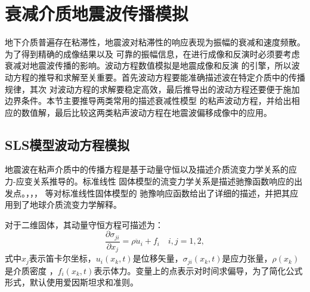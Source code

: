 \vspace{0.5cm}
\section{衰减介质地震波传播模拟}
\vspace{0.5cm}
地下介质普遍存在粘滞性，地震波对粘滞性的响应表现为振幅的衰减和速度频散。为了得到精确的成像结果以及
可靠的振幅信息，在进行成像和反演时必须要考虑衰减对地震波传播的影响。波动方程数值模拟是地震成像和反演
的引擎，所以波动方程的推导和求解至关重要。首先波动方程要能准确描述波在特定介质中的传播规律，其次
对波动方程的求解要稳定高效，最后推导出的波动方程还要便于施加边界条件。本节主要推导两类常用的描述衰减性模型
的粘声波动方程，并给出相应的数值解，最后比较这两类粘声波动方程在地震波偏移成像中的应用。

\subsection{SLS模型波动方程模拟}
地震波在粘声介质中的传播方程是基于动量守恒以及描述介质流变力学关系的应力-应变关系推导的。标准线性
固体模型的流变力学关系是描述驰豫函数响应的出发点。，，， 等对标准线性固体模型的
驰豫响应函数给出了详细的描述，并把其应用到了地球介质流变力学解释。

对于二维固体，其动量守恒方程可描述为：
\begin{equation}
	\frac{\partial\sigma_{ji}}{\partial x_j}=\rho\ddot{u}_i+f_i \quad i,j=1,2,
	\label{eq:dl}
\end{equation}
式中$x_j$表示笛卡尔坐标，$u_i(x_k,t)$是位移矢量，$\sigma_{ji}(x_k,t)$是应力张量，$\rho(x_k)$是介质密度
，$f_i(x_k,t)$表示体力。变量上的点表示对时间求偏导，为了简化公式形式，默认使用爱因斯坦求和准则。


